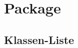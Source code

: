 
\chapter[Package ontologyFramework.OFProcedureManagment]{Package }\label{ontologyFramework.OFProcedureManagment-package}



\section{Klassen-Liste}
